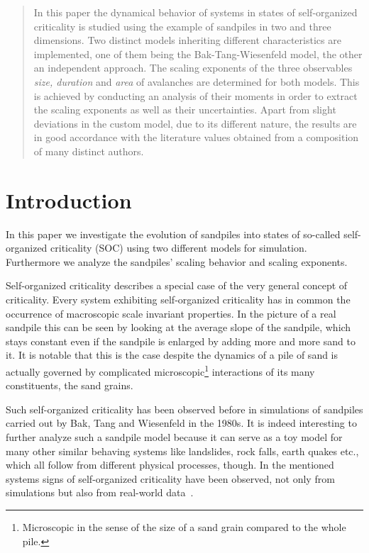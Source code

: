 \begin{abstract}
In this paper the dynamical behavior of systems in states of self-organized criticality is studied using the example
of sandpiles in two and three dimensions. Two distinct models inheriting different characteristics are implemented,
one of them being the Bak-Tang-Wiesenfeld model, the other an independent approach.
The scaling exponents of the three observables \textit{size, duration} and \textit{area} of avalanches are determined
for both models. This is achieved by conducting an analysis of their moments in order to extract the scaling exponents
as well as their uncertainties. Apart from slight deviations in the custom model, due to its different nature,
the results are in good accordance with the literature values obtained from a composition of many distinct authors.
\end{abstract}

\maketitle

\section{Introduction}
\label{sec:intro}
In this paper we investigate the evolution of sandpiles into states of so-called self-organized criticality (SOC) using
two different models for simulation. Furthermore we analyze the sandpiles' scaling behavior and scaling exponents.

Self-organized criticality describes a special case of the very general concept of criticality. Every system
exhibiting self-organized criticality has in common the occurrence of macroscopic scale invariant properties.
In the picture of a real sandpile this can be seen by looking at the average slope of the sandpile,
which stays constant even if the sandpile is enlarged by adding more and more sand to it.
It is notable that this is the case despite the dynamics of a pile of sand is actually governed by complicated
microscopic\footnote{Microscopic in the sense of the size of a sand grain compared to the whole pile.} interactions
of its many constituents, the sand grains.

Such self-organized criticality has been observed before in simulations of sandpiles carried out by Bak, Tang and
Wiesenfeld in the 1980s. It is indeed interesting to further analyze such a sandpile model
because it can serve as a toy model for many other similar behaving systems like landslides, rock falls, earth quakes
etc., which all follow from different physical processes, though.
In the mentioned systems signs of self-organized criticality have been observed, not only from simulations but also
from real-world data~\cite{Hergarten}.

